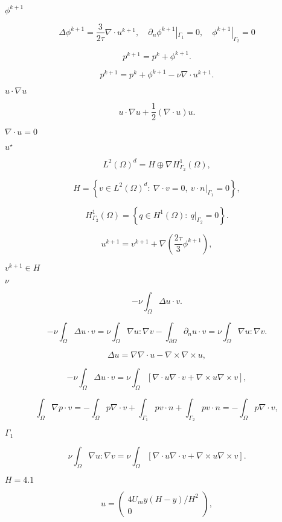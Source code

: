 \documentclass{article}
\begin{document}
$\phi^{k+1}$
\pagebreak

\[ \Delta \phi^{k+1} = \frac3{2\tau} \nabla \cdot u^{k+1}, \quad \partial_n \phi^{k+1}|_{\Gamma_1} = 0, \quad \phi^{k+1}|_{\Gamma_2} = 0 \]
\pagebreak

\[ p^{k+1} = p^k + \phi^{k+1}. \]
\pagebreak

\[ p^{k+1} = p^k + \phi^{k+1} - \nu \nabla \cdot u^{k+1}. \]
\pagebreak

$u\cdot\nabla u$
\pagebreak

\[ u \cdot \nabla u + \frac12 \left( \nabla\cdot u \right) u. \]
\pagebreak

$\nabla\cdot u = 0$
\pagebreak

$u^\star$
\pagebreak

\[ L^2(\Omega)^d = H \oplus \nabla H^1_{\Gamma_2}(\Omega), \]
\pagebreak

\[ H = \left\{ v \in L^2(\Omega)^d:\ \nabla\cdot v =0, \ v\cdot n|_{\Gamma_1} = 0 \right\}, \]
\pagebreak

\[ H^1_{\Gamma_2}(\Omega) = \left\{ q \in H^1(\Omega):\ q|_{\Gamma_2} = 0 \right\}. \]
\pagebreak

\[ u^{k+1} = v^{k+1} + \nabla \left( \frac{2\tau}{3} \phi^{k+1} \right), \]
\pagebreak

$v^{k+1}\in H$
\pagebreak

$\nu$
\pagebreak

\[ -\nu \int_\Omega \Delta u \cdot v. \]
\pagebreak

\[ -\nu \int_\Omega \Delta u \cdot v = \nu \int_\Omega \nabla u : \nabla v - \int_{\partial\Omega} \partial_n u \cdot v = \nu \int_\Omega \nabla u : \nabla v. \]
\pagebreak

\[ \Delta u = \nabla\nabla\cdot u - \nabla\times\nabla\times u, \]
\pagebreak

\[ -\nu \int_\Omega \Delta u \cdot v = \nu \int_\Omega \left[ \nabla \cdot u \nabla \cdot v + \nabla \times u \nabla \times v \right], \]
\pagebreak

\[ \int_\Omega \nabla p \cdot v = -\int_\Omega p \nabla \cdot v + \int_{\Gamma_1} p v\cdot n + \int_{\Gamma_2} p v\cdot n = -\int_\Omega p \nabla \cdot v, \]
\pagebreak

$\Gamma_1$
\pagebreak

\[ \nu \int_\Omega \nabla u : \nabla v = \nu \int_\Omega \left[ \nabla \cdot u \nabla \cdot v + \nabla \times u \nabla \times v \right]. \]
\pagebreak

$H=4.1$
\pagebreak

\[ u = \left( \begin{array}{c} 4 U_m y (H-y)/H^2 \\ 0 \end{array} \right), \]
\pagebreak
\end{document}
